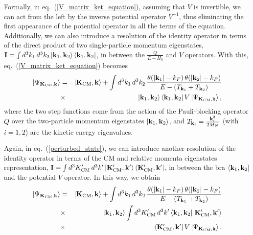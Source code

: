 \documentclass[aps,twocolumn,showpacs,preprintnumbers,amsmath,amssymb,nofootinbib,superscriptaddress,showkeys,noeprint]{revtex4-1}
\newcommand{\nk}{{\bf k}}
\newcommand{\nK}{{\bf K}}
\begin{document}
Formally, in eq.~(\ref{V_matrix_ket_equation}), assuming that $V$ is
invertible, we can act from the left by the inverse potential operator
$V^{-1}$, thus eliminating the first appearance of the potential
operator in all the terms of the equation. Additionally, we can also
introduce a resolution of the identity operator in terms of the direct
product of two single-particle momentum eigenstates, $\mathbf{I}=\int
d^3k_1 \, d^3k_2 \left| \nk_1,\nk_2 \right\rangle \left\langle
\nk_1,\nk_2\right|$, in between the $\frac{Q}{E-H_0}$ and $V$
operators. With this, eq.~(\ref{V_matrix_ket_equation}) becomes
\begin{eqnarray}
\left| \Psi_{\nK_{\rm CM},\nk}\right\rangle&=&
\left| \nK_{\rm CM},\nk\right\rangle +
\int d^3k_1 \, d^3k_2\, \frac{\theta(\left|\nk_1 \right|-k_F)\,
\theta(\left|\nk_2 \right|-k_F)}{E-\left(T_{\nk_1}+T_{\nk_2} \right)}
\nonumber\\
&\times& \left| \nk_1,\nk_2 \right\rangle \left\langle \nk_1,\nk_2\right|
V \left| \Psi_{\nK_{\rm CM},\nk}\right\rangle, \label{perturbed_state}
\end{eqnarray}
where the two step functions come from the action of the
Pauli-blocking operator $Q$ over the two-particle momentum eigenstates
$ \left| \nk_1,\nk_2 \right\rangle$, and $T_{\nk_i}=
\frac{\nk^2_i}{2M_N}$ (with $i=1,2$) are the kinetic energy
eigenvalues.

Again, in eq.~(\ref{perturbed_state}), we can introduce another
resolution of the identity operator in terms of the CM and relative
momenta eigenstates representation, $\mathbf{I}=\int d^3K^\prime_{\rm
  CM} \, d^3k^\prime \left| \nK^\prime_{\rm CM},\nk^\prime
\right\rangle \left\langle \nK^\prime_{\rm CM},\nk^\prime \right|$, in
between the bra $\left\langle \nk_1,\nk_2\right|$ and the potential
$V$ operator.  In this way, we obtain
\begin{eqnarray}
\left| \Psi_{\nK_{\rm CM},\nk}\right\rangle&=&
\left| \nK_{\rm CM},\nk\right\rangle + 
\int d^3k_1 \, d^3k_2\, \frac{\theta(\left|\nk_1 \right|-k_F)\,
\theta(\left|\nk_2 \right|-k_F)}{E-\left(T_{\nk_1}+T_{\nk_2} \right)}
\nonumber\\
&\times& \left| \nk_1,\nk_2 \right\rangle 
\int d^3K^\prime_{\rm CM} \, d^3k^\prime
\left\langle \nk_1,\nk_2\right| \left. 
\nK^\prime_{\rm CM},\nk^\prime \right\rangle \nonumber\\
&\times&\left\langle \nK^\prime_{\rm CM},\nk^\prime \right| V 
\left| \Psi_{\nK_{\rm CM},\nk}\right\rangle. \label{perturbed_state_2}
\end{eqnarray}
\end{document}
